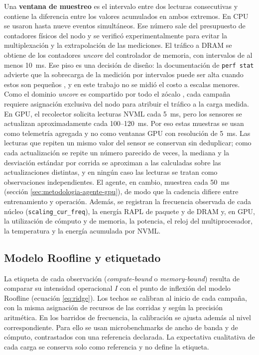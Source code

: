 Una \textbf{ventana de muestreo} es el intervalo entre dos lecturas consecutivas y contiene la diferencia entre los valores acumulados en ambos extremos. En CPU se usaron hasta nueve eventos simultáneos. Ese número sale del presupuesto de contadores físicos del nodo y se verificó experimentalmente para evitar la multiplexación y la extrapolación de las mediciones. El tráfico a DRAM se obtiene de los contadores \textit{uncore} del controlador de memoria, con intervalos de al menos 10~ms. Ese piso es una decisión de diseño: la documentación de \texttt{perf stat} advierte que la sobrecarga de la medición por intervalos puede ser alta cuando estos son pequeños \cite{PerfMeasurementOverhead2026}, y en este trabajo no se midió el costo a escalas menores. Como el dominio \textit{uncore} es compartido por todo el zócalo \cite{IntelUncore2021}, cada campaña requiere asignación exclusiva del nodo para atribuir el tráfico a la carga medida. En GPU, el recolector solicita lecturas NVML cada 5~ms, pero los sensores se actualizan aproximadamente cada 100--120~ms. Por eso estas muestras se usan como telemetría agregada y no como ventanas GPU con resolución de 5~ms. Las lecturas que repiten un mismo valor del sensor se conservan sin deduplicar; como cada actualización se repite un número parecido de veces, la mediana y la desviación estándar por corrida se aproximan a las calculadas sobre las actualizaciones distintas, y en ningún caso las lecturas se tratan como observaciones independientes. El agente, en cambio, muestrea cada 50~ms (sección \ref{sec:metodologia-agente-gpu}), de modo que la cadencia difiere entre entrenamiento y operación. Además, se registran la frecuencia observada de cada núcleo (\texttt{scaling\_cur\_freq}), la energía RAPL de paquete y de DRAM y, en GPU, la utilización de cómputo y de memoria, la potencia, el reloj del multiprocesador, la temperatura y la energía acumulada por NVML.

\subsection{Modelo Roofline y etiquetado}
\label{sec:met-roofline}

La etiqueta de cada observación (\textit{compute-bound} o \textit{memory-bound}) resulta de comparar su intensidad operacional $I$ con el punto de inflexión del modelo Roofline (ecuación \eqref{eq:ridge}). Los techos se calibran al inicio de cada campaña, con la misma asignación de recursos de las corridas y según la precisión aritmética. En los barridos de frecuencia, la calibración se ajusta además al nivel correspondiente. Para ello se usan microbenchmarks de ancho de banda y de cómputo, contrastados con una referencia declarada. La expectativa cualitativa de cada carga se conserva solo como referencia y no define la etiqueta.

